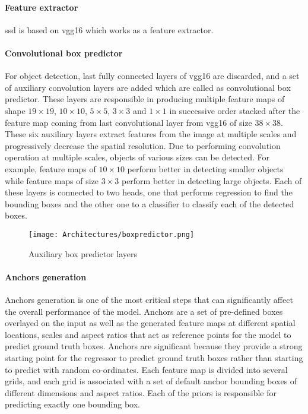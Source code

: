 \paragraph{Feature extractor}

\ac{ssd} is based on \ac{vgg}16 which works as a feature extractor. 

\paragraph{Convolutional box predictor}

For object detection, last fully connected layers of \ac{vgg}16 are discarded, and a set of auxiliary convolution layers are added which are called as convolutional box predictor. These layers are responsible in producing multiple feature maps of shape $19\times19$, $10\times10$, $5\times5$, $3\times3$ and $1\times1$ in successive order stacked after the feature map coming from last convolutional layer from \ac{vgg}16 of size $38\times38$. These six auxiliary layers extract features from the image at multiple scales and progressively decrease the spatial resolution. Due to performing convolution operation at multiple scales, objects of various sizes can be detected. For example, feature maps of $10\times10$ perform better in detecting smaller objects while feature maps of size $3\times3$ perform better in detecting large objects. Each of these layers is connected to two heads, one that performs regression to find the bounding boxes and the other one to a classifier to classify each of the detected boxes.

\begin{figure}[h!]
    \centering
    \texttt{[image: Architectures/boxpredictor.png]}
    \caption{Auxiliary box predictor layers \cite{AI-Dairy}}
    \label{Auxiliary}
\end{figure}

\paragraph{Anchors generation}

Anchors generation is one of the most critical steps that can significantly affect the overall performance of the model. Anchors are a set of pre-defined boxes overlayed on the input as well as the generated feature maps at different spatial locations, scales and aspect ratios that act as reference points for the model to predict ground truth boxes. Anchors are significant because they provide a strong starting point for the regressor to predict ground truth boxes rather than starting to predict with random co-ordinates. Each feature map is divided into several grids, and each grid is associated with a set of default anchor bounding boxes of different dimensions and aspect ratios. Each of the priors is responsible for predicting exactly one bounding box.  

